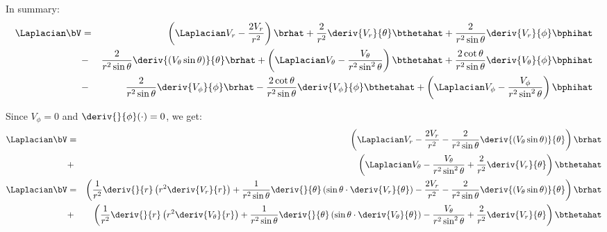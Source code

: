 In summary:
\begin{eqnarray}
\Laplacian \bV &=& \left(\Laplacian V_r - \frac{2V_r}{r^2}\right)\brhat
+ \frac{2}{r^2}\deriv{V_r}{\theta} \bthetahat + \frac{2}{r^2 \sin\theta}\deriv{V_r}{\phi} \bphihat \\
&-&
\frac{2}{r^2 \sin\theta} \deriv{\left(V_\theta \sin\theta \right)}{\theta}\brhat
+ \left(\Laplacian V_\theta - \frac{V_\theta}{r^2 \sin^2\theta}\right) \bthetahat
+ \frac{2 \cot\theta}{r^2 \sin\theta} \deriv{V_\theta}{\phi} \bphihat \\
&-&
\frac{2}{r^2 \sin\theta}\deriv{V_\phi}{\phi}\brhat -
\frac{2 \cot\theta}{r^2 \sin\theta}\deriv{V_\phi}{\phi}\bthetahat
+ \left(\Laplacian V_\phi - \frac{V_\phi}{r^2 \sin^2\theta}\right)\bphihat
\end{eqnarray}

Since $V_\phi = 0$ and $\deriv{}{\phi}(\cdot) = 0$, we get:
\begin{eqnarray}
\Laplacian \bV &=& \left(\Laplacian V_r - \frac{2V_r}{r^2} - \frac{2}{r^2 \sin\theta} \deriv{\left(V_\theta \sin\theta \right)}{\theta}\right)\brhat
\\
&+&
\left(\Laplacian V_\theta - \frac{V_\theta}{r^2 \sin^2\theta} + \frac{2}{r^2}\deriv{V_r}{\theta}\right) \bthetahat
\\
\Laplacian \bV &=& \left(
\frac{1}{r^2}\deriv{}{r}\left( r^2 \deriv{V_r}{r} \right) + \frac{1}{r^2 \sin\theta} \deriv{}{\theta} \left( \sin\theta \cdot \deriv{V_r}{\theta}\right)
 - \frac{2V_r}{r^2} - \frac{2}{r^2 \sin\theta} \deriv{\left(V_\theta \sin\theta \right)}{\theta}\right)\brhat \\
&+& \left(
\frac{1}{r^2}\deriv{}{r}\left( r^2 \deriv{V_\theta}{r} \right) + \frac{1}{r^2 \sin\theta} \deriv{}{\theta} \left( \sin\theta \cdot \deriv{V_\theta}{\theta}\right)
 - \frac{V_\theta}{r^2 \sin^2\theta} + \frac{2}{r^2}\deriv{V_r}{\theta}\right) \bthetahat
\end{eqnarray}

